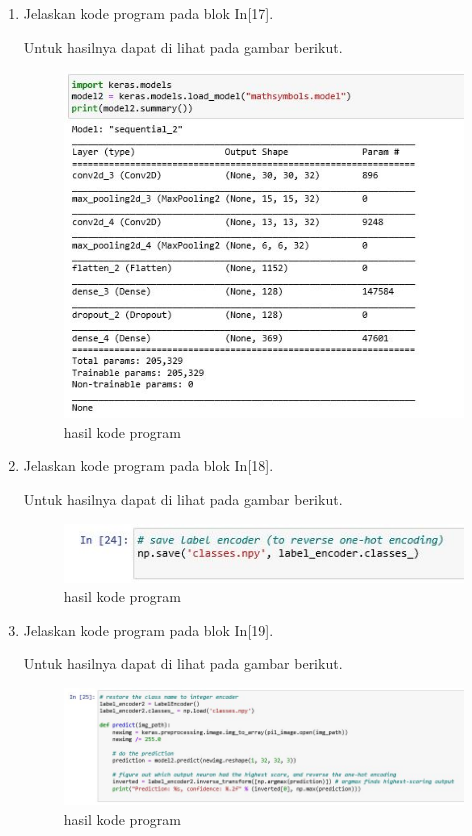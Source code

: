 \begin{enumerate}
\item Jelaskan kode program pada blok  In[17].

Untuk hasilnya dapat di lihat pada gambar berikut.
\begin{figure}[ht]
\centering
\includegraphics[scale=0.4]{figures/1174042/chapter7/2,17.JPG}
\caption{hasil kode program}
\label{Contoh}
\end{figure}

\item Jelaskan kode program pada blok  In[18].

Untuk hasilnya dapat di lihat pada gambar berikut.
\begin{figure}[ht]
\centering
\includegraphics[scale=0.4]{figures/1174042/chapter7/2,18.JPG}
\caption{hasil kode program}
\label{Contoh}
\end{figure}

\item Jelaskan kode program pada blok  In[19].

Untuk hasilnya dapat di lihat pada gambar berikut.
\begin{figure}[ht]
\centering
\includegraphics[scale=0.4]{figures/1174042/chapter7/2,19.JPG}
\caption{hasil kode program}
\label{Contoh}
\end{figure}


\end{enumerate}
